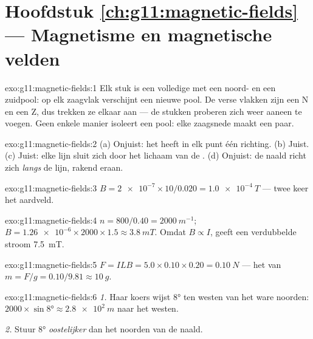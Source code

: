 \section*{Hoofdstuk \ref{ch:g11:magnetic-fields} --- Magnetisme en magnetische velden}

\begin{solution}{exo:g11:magnetic-fields:1}
Elk stuk is een volledige  met een noord- en een zuidpool: op elk
zaagvlak verschijnt een nieuwe pool. De verse vlakken zijn een N en een
Z, dus trekken ze elkaar aan --- de stukken proberen zich weer
aaneen te voegen. Geen enkele manier isoleert een pool: elke zaagsnede
maakt een paar.
\end{solution}

\begin{solution}{exo:g11:magnetic-fields:2}
(a) Onjuist: het  heeft in elk punt één richting. (b) Juist.
(c) Juist: elke lijn sluit zich door het lichaam van de .
(d) Onjuist: de naald richt zich \emph{langs} de lijn, rakend eraan.
\end{solution}

\begin{solution}{exo:g11:magnetic-fields:3}
$B = \num{2e-7} \times 10 / 0.020 = \qty{1.0e-4}{T}$ --- twee keer het
aardveld.
\end{solution}

\begin{solution}{exo:g11:magnetic-fields:4}
$n = 800/0.40 = \qty{2000}{m^{-1}}$;
$B = \num{1.26e-6} \times 2000 \times 1.5 \approx \qty{3.8}{mT}$. Omdat
$B \propto I$, geeft een verdubbelde stroom \qty{7.5}{mT}.
\end{solution}

\begin{solution}{exo:g11:magnetic-fields:5}
$F = ILB = 5.0 \times 0.10 \times 0.20 = \qty{0.10}{N}$ --- het 
van $m = F/g = 0.10/9.81 \approx \qty{10}{g}$.
\end{solution}

\begin{solution}{exo:g11:magnetic-fields:6}
\emph{1.} Haar koers wijst $\ang{8}$ ten westen van het ware noorden:
$2000 \times \sin\ang{8} \approx \qty{2.8e2}{m}$ naar het westen.

\emph{2.} Stuur $\ang{8}$ \emph{oostelijker} dan het noorden van de
naald.
\end{solution}

